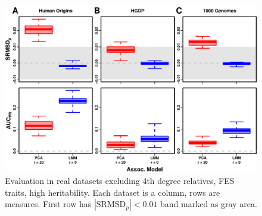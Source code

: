 \documentclass[9pt,lineno]{elife}
\newcommand{\rmsd}{\text{SRMSD}_p}
\begin{document}
\begin{figure}
  \includegraphics[width=\textwidth]{fes/rmsd-auc_king-cutoff-4.pdf}
  \caption{
    Evaluation in real datasets excluding 4th degree relatives, FES traits, high heritability.
    Each dataset is a column, rows are measures.
    First row has $|\rmsd| < 0.01$ band marked as gray area.
  }
  \label{fig:king_cutoff}
  \label{figsupp:king_cutoff-h3}
\end{figure}
\end{document}

